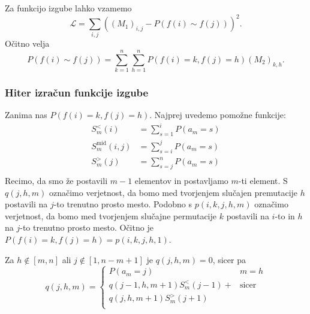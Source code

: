 \documentclass[mat2, tisk]{fmfdelo}
\newcommand{\loss }{\mathcal L}
\begin{document}
            Za funkcijo izgube lahko vzamemo
            $$
            \loss = \sum_{i, j} ( (M_1)_{i,j} - P(f(i) \sim f(j)) )^2.
            $$
            Očitno velja
            $$
            P(f(i) \sim f(j)) = \sum_{k=1}^n \sum_{h=1}^n P(f(i) = k,
            f(j) = h) (M_2)_{k,h}.
            $$
            \subsubsection{Hiter izračun funkcije izgube}
            Zanima nas $P(f(i) = k, f(j) = h)$.
            Najprej uvedemo pomožne funkcije:
            \begin{align*}
              S_m^<(i) &= \sum_{s=1}^{i} P(a_m = s) \\
              S_m^\text{mid}(i,j) &= \sum_{s=i}^{j} P(a_m = s) \\
              S_m^>(j) &= \sum_{s=j}^{n} P(a_m = s) \\
            \end{align*}
            Recimo, da smo že postavili $m-1$ elementov
            in postavljamo $m$-ti element. S
            $q(j,h,m)$ označimo verjetnost, da bomo med
            tvorjenjem slučajen premutacije $h$ postavili na
            $j$-to trenutno prosto mesto. Podobno s $p(i, k, j, h,
            m)$ označimo verjetnost, da bomo
            med tvorjenjem slučajne permutacije $k$ postavili na
            $i$-to in $h$ na $j$-to trenutno prosto mesto.
            Očitno je $P(f(i) = k, f(j) = h) = p(i, k, j, h,1)$.

            Za $h \notin [m, n]$ ali $j \notin [1, n-m+1]$ je
            $q(j,h,m) = 0$, sicer pa
            $$
            q(j, h, m) =
            \begin{cases}
              P(a_m = j) & m = h \\
              q(j-1, h, m+1) S_m^<(j-1) +
              & \text{sicer} \\
              q(j, h, m+1) S_m^>(j+1)&\\
            \end{cases}
            $$
\end{document}
